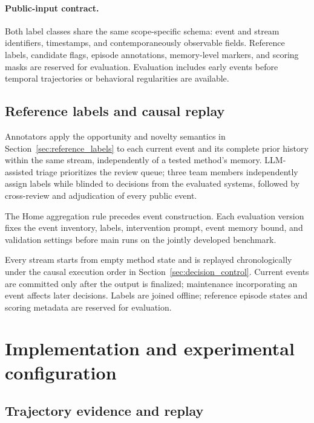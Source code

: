 \paragraph{Public-input contract.}
Both label classes share the same scope-specific schema: event and stream identifiers, timestamps, and contemporaneously observable fields.
Reference labels, candidate flags, episode annotations, memory-level markers, and scoring masks are reserved for evaluation.
Evaluation includes early events before temporal trajectories or behavioral regularities are available.

\subsection{Reference labels and causal replay}
\label{app:reference_protocol}

Annotators apply the opportunity and novelty semantics in Section~\ref{sec:reference_labels} to each current event and its complete prior history within the same stream, independently of a tested method's memory.
LLM-assisted triage prioritizes the review queue; three team members independently assign labels while blinded to decisions from the evaluated systems, followed by cross-review and adjudication of every public event.

The Home aggregation rule precedes event construction.
Each evaluation version fixes the event inventory, labels, intervention prompt, event memory bound, and validation settings before main runs on the jointly developed benchmark.

Every stream starts from empty method state and is replayed chronologically under the causal execution order in Section~\ref{sec:decision_control}.
Current events are committed only after the output is finalized; maintenance incorporating an event affects later decisions.
Labels are joined offline; reference episode states and scoring metadata are reserved for evaluation.



\section{Implementation and experimental configuration}
\label{app:implementation}

\subsection{Trajectory evidence and replay}

